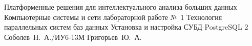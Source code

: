 \makereporttitle
    {Платформенные решения для интеллектуального анализа больших данных}
    {Компьютерные системы и сети}
    {лабораторной работе №~1}
    {Технология параллельных систем баз данных}
    {Установка и настройка СУБД PostgreSQL}
    {2}
    {Соболев~Н.~А./ИУ6-13М}
    {Григорьев~Ю.~А.}

\newpage